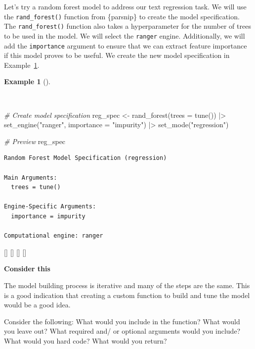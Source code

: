 \documentclass[
  letterpaper,
  krantz1]{latex/krantz-mod}
\newenvironment{Shaded}{\begin{snugshade}}{\end{snugshade}}
\newcommand{\AttributeTok}[1]{\textcolor[rgb]{0.00,0.00,0.00}{#1}}
\newcommand{\CommentTok}[1]{\textcolor[rgb]{0.00,0.00,0.00}{\textit{#1}}}
\newcommand{\FunctionTok}[1]{\textcolor[rgb]{0.00,0.00,0.00}{#1}}
\newcommand{\NormalTok}[1]{\textcolor[rgb]{0.00,0.00,0.00}{#1}}
\newcommand{\OtherTok}[1]{\textcolor[rgb]{0.00,0.00,0.00}{#1}}
\newcommand{\SpecialCharTok}[1]{\textcolor[rgb]{0.00,0.00,0.00}{#1}}
\newcommand{\StringTok}[1]{\textcolor[rgb]{0.00,0.00,0.00}{#1}}
\newcommand{\cindex}[1]{%
  \StrSubstitute{#1}{_}{\_}[\temp]%
  \index{\temp}%
}
\theoremstyle{definition}
\theoremstyle{definition}
\newtheorem{example}{Example}[chapter]
\theoremstyle{remark}
\begin{document}
Let's try a random forest model to address our text regression task. We
will use the \texttt{rand\_forest()} function from \{parsnip\} to create
the model specification. The \texttt{rand\_forest()} function also takes
a hyperparameter for the number of trees to be used in the model. We
will select the \texttt{ranger} engine. Additionally, we will add the
\texttt{importance} argument to ensure that we can extract feature
importance if this model proves to be useful. We create the new model
specification in Example~\ref{exm-predict-reg-model-spec-random-forest}.

\begin{example}[]\protect\hypertarget{exm-predict-reg-model-spec-random-forest}{}\label{exm-predict-reg-model-spec-random-forest}

~

\begin{Shaded}
\begin{Highlighting}[numbers=left,,]
\CommentTok{\# Create model specification}
\NormalTok{reg\_spec }\OtherTok{\textless{}{-}}
  \FunctionTok{rand\_forest}\NormalTok{(}\AttributeTok{trees =} \FunctionTok{tune}\NormalTok{()) }\SpecialCharTok{|\textgreater{}}
  \FunctionTok{set\_engine}\NormalTok{(}\StringTok{"ranger"}\NormalTok{, }\AttributeTok{importance =} \StringTok{"impurity"}\NormalTok{) }\SpecialCharTok{|\textgreater{}}
  \FunctionTok{set\_mode}\NormalTok{(}\StringTok{"regression"}\NormalTok{)}

\CommentTok{\# Preview}
\NormalTok{reg\_spec}
\end{Highlighting}
\end{Shaded}

\begin{verbatim}
Random Forest Model Specification (regression)

Main Arguments:
  trees = tune()

Engine-Specific Arguments:
  importance = impurity

Computational engine: ranger
\end{verbatim}

\cindex{rand_forest()}\cindex{set_engine()}\cindex{set_mode()}\cindex{tune()}

\end{example}

\begin{tcolorbox}[enhanced jigsaw, toprule=.15mm, breakable, colback=white, arc=.35mm, left=2mm, colframe=quarto-callout-color-frame, opacityback=0, bottomrule=.15mm, rightrule=.15mm, leftrule=.75mm]

\textbf{ Consider this}

The model building process is iterative and many of the steps are the
same. This is a good indication that creating a custom function to build
and tune the model would be a good idea.

Consider the following: What would you include in the function? What
would you leave out? What required and/ or optional arguments would you
include? What would you hard code? What would you return?

\end{tcolorbox}
\end{document}
